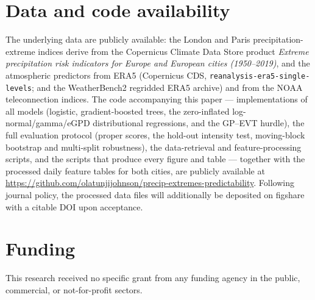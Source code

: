 \documentclass[11pt,a4paper]{article}
\begin{document}
\section*{Data and code availability}\label{sec:availability}
The underlying data are publicly available: the London and Paris
precipitation-extreme indices derive from the Copernicus Climate Data Store
product \emph{Extreme precipitation risk indicators for Europe and European cities
(1950--2019)}, and the atmospheric predictors from ERA5 (Copernicus CDS,
\texttt{reanalysis-era5-single-levels}; and the WeatherBench2 regridded ERA5
archive) and from the NOAA teleconnection indices. The code accompanying this
paper --- implementations of all models (logistic, gradient-boosted trees, the
zero-inflated log-normal/gamma/eGPD distributional regressions, and the
GP--EVT hurdle), the full evaluation protocol (proper scores, the hold-out
intensity test, moving-block bootstrap and multi-split robustness), the
data-retrieval and feature-processing scripts, and the scripts that produce every
figure and table --- together with the processed daily feature tables for both
cities, are publicly available at
\url{https://github.com/olatunjijohnson/precip-extremes-predictability}.
Following journal policy, the processed data files will additionally be deposited
on figshare with a citable DOI upon acceptance.


\section*{Funding}
This research received no
specific grant from any funding agency in the public, commercial, or
not-for-profit sectors.
\end{document}
